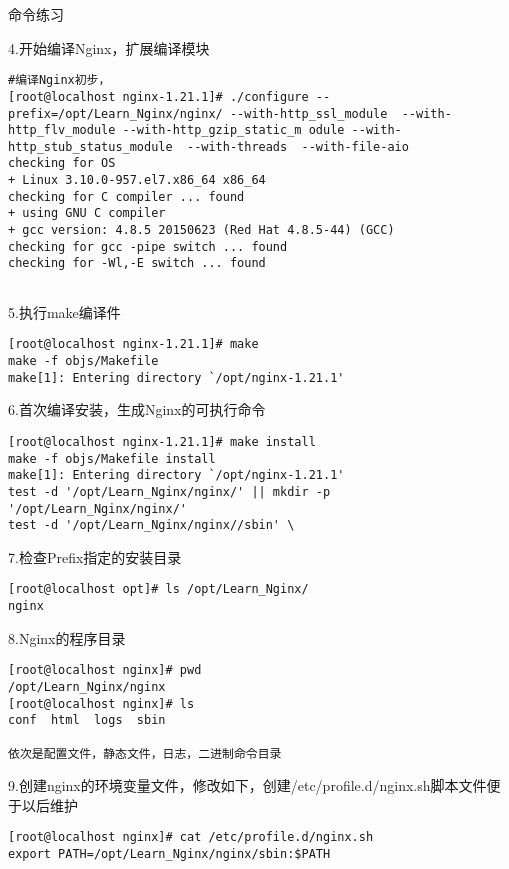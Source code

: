 \begin{ascolorbox10}{命令练习}
\begin{ascboxJ}{4.开始编译Nginx，扩展编译模块}
\begin{lstlisting}[style=linux]
#编译Nginx初步，
[root@localhost nginx-1.21.1]# ./configure --prefix=/opt/Learn_Nginx/nginx/ --with-http_ssl_module  --with-http_flv_module --with-http_gzip_static_m odule --with-http_stub_status_module  --with-threads  --with-file-aio
checking for OS
+ Linux 3.10.0-957.el7.x86_64 x86_64
checking for C compiler ... found
+ using GNU C compiler
+ gcc version: 4.8.5 20150623 (Red Hat 4.8.5-44) (GCC)
checking for gcc -pipe switch ... found
checking for -Wl,-E switch ... found


	\end{lstlisting}
\end{ascboxJ}

	\begin{ascboxJ}{5.执行make编译件}
	\begin{lstlisting}[style=linux]
[root@localhost nginx-1.21.1]# make
make -f objs/Makefile
make[1]: Entering directory `/opt/nginx-1.21.1'
	\end{lstlisting}
\end{ascboxJ}

	\begin{ascboxJ}{6.首次编译安装，生成Nginx的可执行命令}
	\begin{lstlisting}[style=linux]
[root@localhost nginx-1.21.1]# make install
make -f objs/Makefile install
make[1]: Entering directory `/opt/nginx-1.21.1'
test -d '/opt/Learn_Nginx/nginx/' || mkdir -p '/opt/Learn_Nginx/nginx/'
test -d '/opt/Learn_Nginx/nginx//sbin' \
	\end{lstlisting}
\end{ascboxJ}

	\begin{ascboxJ}{7.检查Prefix指定的安装目录}
	\begin{lstlisting}[style=linux]
[root@localhost opt]# ls /opt/Learn_Nginx/
nginx
	\end{lstlisting}
\end{ascboxJ}

	\begin{ascboxJ}{8.Nginx的程序目录}
	\begin{lstlisting}[style=linux]
[root@localhost nginx]# pwd
/opt/Learn_Nginx/nginx
[root@localhost nginx]# ls
conf  html  logs  sbin

依次是配置文件，静态文件，日志，二进制命令目录
	\end{lstlisting}
\end{ascboxJ}

	\begin{ascboxJ}{9.创建nginx的环境变量文件，修改如下，创建/etc/profile.d/nginx.sh脚本文件便于以后维护}
	\begin{lstlisting}[style=linux]
[root@localhost nginx]# cat /etc/profile.d/nginx.sh
export PATH=/opt/Learn_Nginx/nginx/sbin:$PATH
	\end{lstlisting}
\end{ascboxJ}


\end{ascolorbox10}
